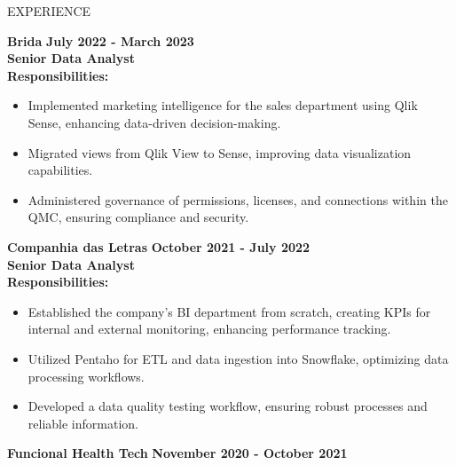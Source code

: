 \documentclass{resume} %
\begin{document}
\begin{rSection}{EXPERIENCE}
\begin{flushleft}
            \textbf{Brida} \hfill \textbf{July 2022 {-} March 2023} \\
            \textbf{Senior Data Analyst} \\
            \vspace{1em}
            \textbf{Responsibilities:} \\
            \begin{itemize}
                                    \item Implemented marketing intelligence for the sales department using Qlik Sense, enhancing data{-}driven decision{-}making.
                                    \item Migrated views from Qlik View to Sense, improving data visualization capabilities.
                                    \item Administered governance of permissions, licenses, and connections within the QMC, ensuring compliance and security.
                            \end{itemize}
            \vspace{0.5em}
            \textbf{Companhia das Letras} \hfill \textbf{October 2021 {-} July 2022} \\
            \textbf{Senior Data Analyst} \\
            \vspace{1em}
            \textbf{Responsibilities:} \\
            \begin{itemize}
                                    \item Established the company's BI department from scratch, creating KPIs for internal and external monitoring, enhancing performance tracking.
                                    \item Utilized Pentaho for ETL and data ingestion into Snowflake, optimizing data processing workflows.
                                    \item Developed a data quality testing workflow, ensuring robust processes and reliable information.
                            \end{itemize}
            \vspace{0.5em}
            \textbf{Funcional Health Tech} \hfill \textbf{November 2020 {-} October 2021} \\

\end{flushleft}
\end{rSection}
\end{document}
